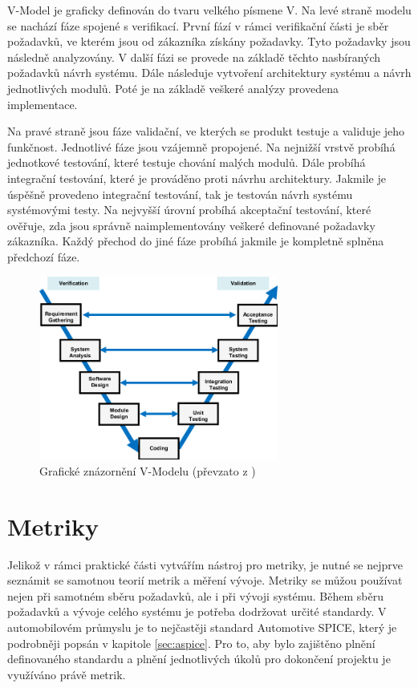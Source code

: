 \documentclass[czech,master,public,dept460,male,cpdeclaration,oneside]{diploma}
\begin{document}
V-Model je graficky definován do tvaru velkého písmene V. Na levé straně modelu se nachází fáze spojené s verifikací. První fází v rámci verifikační části je sběr požadavků, ve kterém jsou od zákazníka získány požadavky. Tyto požadavky jsou následně analyzovány. V další fázi se provede na základě těchto nasbíraných požadavků návrh systému. Dále následuje vytvoření architektury systému a návrh jednotlivých modulů. Poté je na základě veškeré analýzy provedena implementace.

Na pravé straně jsou fáze validační, ve kterých se produkt testuje a validuje jeho funkčnost. Jednotlivé fáze jsou vzájemně propojené. Na nejnižší vrstvě probíhá jednotkové testování, které testuje chování malých modulů. Dále probíhá integrační testování, které je prováděno proti návrhu architektury. Jakmile je úspěšně provedeno integrační testování, tak je testován návrh systému systémovými testy. Na nejvyšší úrovní probíhá akceptační testování, které ověřuje, zda jsou správně naimplementovány veškeré definované požadavky zákazníka. Každý přechod do jiné fáze probíhá jakmile je kompletně splněna předchozí fáze.

 \begin{figure}[!ht]
    \centering
    \includegraphics[width=0.7\textwidth]{Diplomka/Figures/v-model-in-software-testing.png}
    \caption{Grafické znázornění V-Modelu (převzato z \cite{ref:vmodel_Tierno2016})}
    \label{fig:v_model}
\end{figure}


\section{Metriky}
\label{sec:metrics}
Jelikož v rámci praktické části vytvářím nástroj pro metriky, je nutné se nejprve seznámit se samotnou teorií metrik a měření vývoje. Metriky se můžou používat nejen při samotném sběru požadavků, ale i při vývoji systému. Během sběru požadavků a vývoje celého systému je potřeba dodržovat určité standardy. V automobilovém průmyslu je to nejčastěji standard Automotive SPICE, který je podrobněji popsán v kapitole \ref{sec:aspice}. Pro to, aby bylo zajištěno plnění definovaného standardu a plnění jednotlivých úkolů pro dokončení projektu je využíváno právě metrik.
\end{document}
